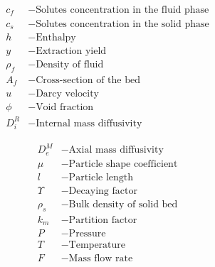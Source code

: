 \documentclass[a0,portrait]{a0poster}
\begin{document}
\begin{multicols}{2}
\begin{tcolorbox}[width=\linewidth, boxrule=0mm, sharp corners=all, colback=white]
\begin{minipage}[h!]{0.5\linewidth}
	\begin{align*}
		c_f &- \text{Solutes concentration in the fluid phase}\\
		c_s &- \text{Solutes concentration in the solid phase}\\
		h~  &- \text{Enthalpy}\\
		y~ &- \text{Extraction yield}\\
		\rho_f &- \text{Density of fluid}\\
		A_f &- \text{Cross-section of the bed}\\
		u~~ &- \text{Darcy velocity}\\
		\phi~~ &- \text{Void fraction}\\
		D_i^R &- \text{Internal mass diffusivity}
	\end{align*}
\end{minipage}
%
\begin{minipage}[h!]{0.5\linewidth}
	\begin{align*}
		D_e^M &- \text{Axial mass diffusivity}\\
		\mu~ &- \text{Particle shape coefficient}\\
		l~ &- \text{Particle length}\\
		\Upsilon~ &- \text{Decaying factor}\\
		\rho_s &- \text{Bulk density of solid bed}\\
		k_m &- \text{Partition factor}\\
		P~ &- \text{Pressure}\\
		T~ &- \text{Temperature}\\
		F~ &- \text{Mass flow rate}
	\end{align*}
\end{minipage}


\end{tcolorbox}
\end{multicols}
\end{document}
